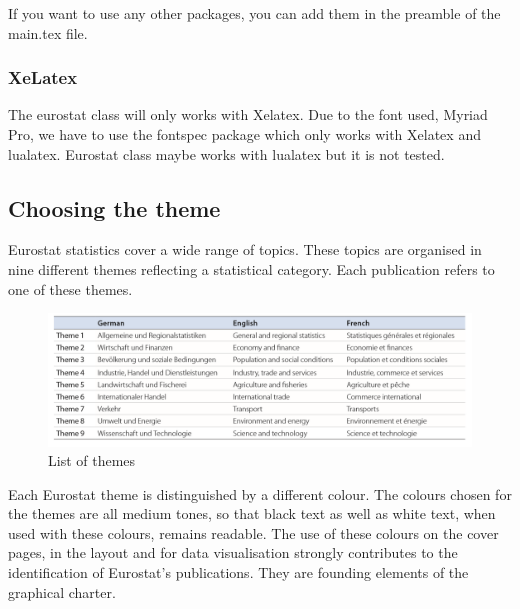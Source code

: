 \documentclass[Theme1]{{template_material/eurostat}}
\begin{document}
If you want to use any other packages, you can add them in the preamble of the main.tex file. 

\newpage
\subsubsection{XeLatex}

The eurostat class will only works with Xelatex. Due to the font used, Myriad Pro, we have to use the fontspec package which only works with Xelatex and lualatex. Eurostat class maybe works with lualatex but it is not tested. 

\subsection{Choosing the theme}

Eurostat statistics cover a wide range of topics. These topics are organised in nine different themes reflecting a statistical category. Each publication refers to one of these themes. 

\begin{figure}[h]
    \caption{List of themes} %
    \label{fig:listofthemes}
    \includegraphics[width=1\textwidth]{template_material/FiguresFiles/List of themes.PNG}
\end{figure}

Each Eurostat theme is distinguished by a different colour.  The colours chosen for the themes are all medium tones, so that black text as well as white text, when used with these colours, remains readable.
The use of these colours on the cover pages, in the layout and for data visualisation strongly contributes to the identification of Eurostat’s publications. They are founding elements of the graphical charter.
\end{document}
